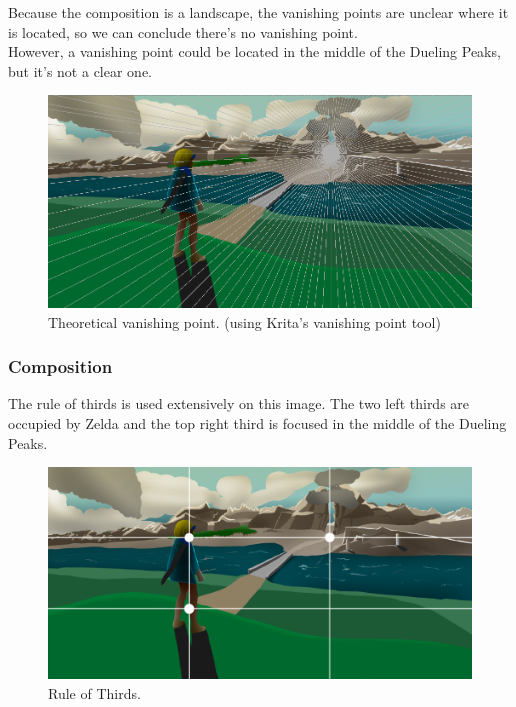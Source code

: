 \documentclass{cup-pan}
\begin{document}
            Because the composition is a landscape, the vanishing points are unclear where it is located, so we can conclude there's no vanishing point.\\
            However, a vanishing point could be located in the middle of the Dueling Peaks, but it's not a clear one.\\
            \begin{figure}[H]
                \includegraphics[width=\textwidth]{Imagenes/Fanart1/Analysis/puntofuga.png}
                \caption{Theoretical vanishing point. (using Krita's vanishing point tool)}
            \end{figure}

        \subsubsection{Composition}

            The rule of thirds is used extensively on this image. The two left thirds are occupied by Zelda and the top right third is focused in the middle of the Dueling Peaks.\\
            \begin{figure}[H]
                \includegraphics[width=\textwidth]{Imagenes/Fanart1/Analysis/reglatercios.png}
                \caption{Rule of Thirds.}
            \end{figure}
\end{document}
